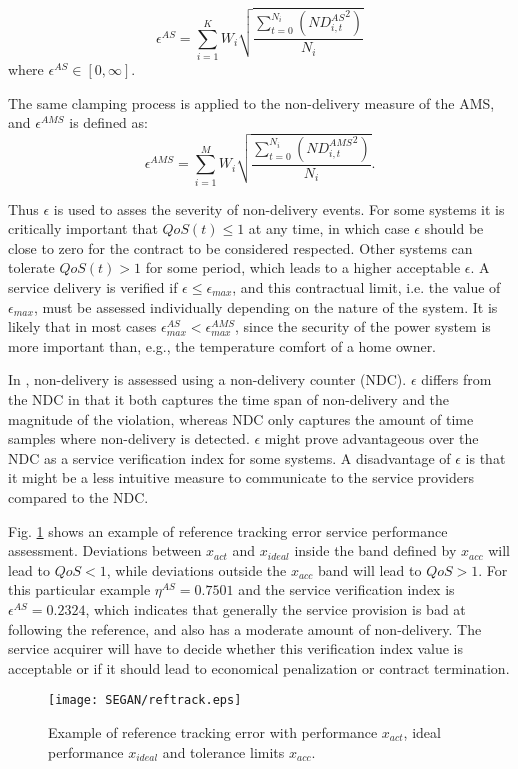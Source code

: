 \begin{equation}\label{eq:epsilonAS}
\epsilon^{AS} = \sum^{K}_{i=1} W_i \sqrt{\frac{\sum^{N_i}_{t=0} \left( {ND^{AS}_{i,t}}^{2} \right)}{N_i}}
\end{equation}
where $\epsilon^{AS} \in [0,\infty]$.

The same clamping process is applied to the non-delivery measure of the AMS, and $\epsilon^{AMS}$ is defined as:
\begin{equation}\label{eq:epsilonAMS}
\epsilon^{AMS} = \sum^{M}_{i=1} W_i \sqrt{\frac{\sum^{N_i}_{t=0} \left( {ND^{AMS}_{i,t}}^{2} \right)}{N_i}}.
\end{equation}

Thus $\epsilon$ is used to asses the severity of non-delivery events. For some systems it is critically important that $QoS(t)\leq1$ at any time, in which case $\epsilon$ should be close to zero for the contract to be considered respected. Other systems can tolerate $QoS(t)>1$ for some period, which leads to a higher acceptable $\epsilon$. A service delivery is verified if $\epsilon \leq \epsilon_{max}$, and this contractual limit, i.e. the value of $\epsilon_{max}$, must be assessed individually depending on the nature of the system. It is likely that in most cases $\epsilon^{AS}_{max}<\epsilon^{AMS}_{max}$, since the security of the power system is more important than, e.g., the temperature comfort of a home owner.

In \cite{bondy2014performance}, non-delivery is assessed using a non-delivery counter (NDC). $\epsilon$ differs from the NDC in that it both captures the time span of non-delivery and the magnitude of the violation, whereas NDC only captures the amount of time samples where non-delivery is detected. $\epsilon$ might prove advantageous over the NDC as a service verification index for some systems. A disadvantage of $\epsilon$ is that it might be a less intuitive measure to communicate to the service providers compared to the NDC.

Fig. \ref{fig:RefErr} shows an example of reference tracking error service performance assessment. Deviations between $x_{act}$ and $x_{ideal}$ inside the band defined by $x_{acc}$ will lead to $QoS<1$, while deviations outside the $x_{acc}$ band will lead to $QoS>1$. For this particular example $\eta^{AS}=0.7501$ and the service verification index is $\epsilon^{AS}=0.2324$, which indicates that generally the service provision is bad at following the reference, and also has a moderate amount of non-delivery. The service acquirer will have to decide whether this verification index value is acceptable or if it should lead to economical penalization or contract termination.

\begin{figure}
\centering
\texttt{[image: SEGAN/reftrack.eps]}
\caption{Example of reference tracking error with performance $x_{act}$, ideal performance $x_{ideal}$ and tolerance limits $x_{acc}$.}
\label{fig:RefErr}
\end{figure}
